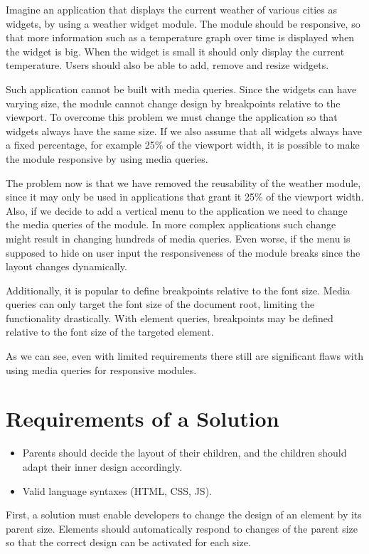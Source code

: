 \documentclass{sigchi}
\begin{document}
  Imagine an application that displays the current weather of various cities as widgets, by using a weather widget module.
  The module should be responsive, so that more information such as a temperature graph over time is displayed when the widget is big.
  When the widget is small it should only display the current temperature.
  Users should also be able to add, remove and resize widgets.

  Such application cannot be built with media queries.
  Since the widgets can have varying size, the module cannot change design by breakpoints relative to the viewport.
  To overcome this problem we must change the application so that widgets always have the same size.
  If we also assume that all widgets always have a fixed percentage, for example 25\% of the viewport width, it is possible to make the module responsive by using media queries.

  The problem now is that we have removed the reusability of the weather module, since it may only be used in applications that grant it 25\% of the viewport width.
  Also, if we decide to add a vertical menu to the application we need to change the media queries of the module.
  In more complex applications such change might result in changing hundreds of media queries.
  Even worse, if the menu is supposed to hide on user input the responsiveness of the module breaks since the layout changes dynamically.

  Additionally, it is popular to define breakpoints relative to the font size.
  Media queries can only target the font size of the document root, limiting the functionality drastically.
  With element queries, breakpoints may be defined relative to the font size of the targeted element.

  As we can see, even with limited requirements there still are significant flaws with using media queries for responsive modules.

\section{Requirements of a Solution}
  \begin{itemize}
    \item Parents should decide the layout of their children, and the children should adapt their inner design accordingly.
    \item Valid language syntaxes (HTML, CSS, JS).
  \end{itemize}

  First, a solution must enable developers to change the design of an element by its parent size.
  Elements should automatically respond to changes of the parent size so that the correct design can be activated for each size.
\end{document}
